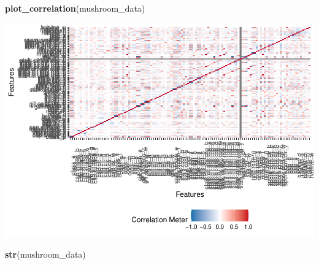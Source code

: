 \documentclass[
  english,
  man]{apa6}
\newenvironment{Shaded}{\begin{snugshade}}{\end{snugshade}}
\newcommand{\KeywordTok}[1]{\textcolor[rgb]{0.13,0.29,0.53}{\textbf{#1}}}
\newcommand{\NormalTok}[1]{#1}
\begin{document}
\begin{Shaded}
\begin{Highlighting}[]
\KeywordTok{plot_correlation}\NormalTok{(mushroom_data)}
\end{Highlighting}
\end{Shaded}

\includegraphics{MSDS680-Week-5-SVM-and-ANNRmd_files/figure-latex/data exploration-3.pdf}

\begin{Shaded}
\begin{Highlighting}[]
\KeywordTok{str}\NormalTok{(mushroom_data)}
\end{Highlighting}
\end{Shaded}
\end{document}

